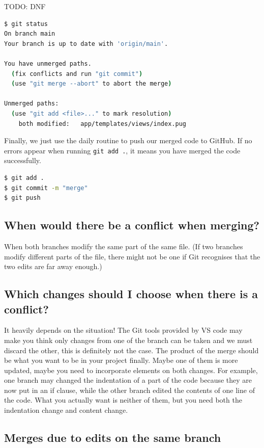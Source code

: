 TODO: DNF

\begin{lstlisting}[language=bash]
$ git status
On branch main
Your branch is up to date with 'origin/main'.

You have unmerged paths.
  (fix conflicts and run "git commit")
  (use "git merge --abort" to abort the merge)

Unmerged paths:
  (use "git add <file>..." to mark resolution)
	both modified:   app/templates/views/index.pug
\end{lstlisting}

Finally, we just use the daily routine to push our merged code to GitHub. If no errors appear when running \texttt{git add .}, it means you have merged the code successfully.
\vspace{6mm}

\begin{lstlisting}[language=bash]
$ git add .
$ git commit -m "merge"
$ git push
\end{lstlisting}

\subsection*{When would there be a conflict when merging?}

When both branches modify the same part of the same file. (If two branches modify different parts of the file, there might not be one if Git recognises that the two edits are far away enough.)

\subsection*{Which changes should I choose when there is a conflict?}

It heavily depends on the situation! The Git tools provided by VS code may make you think only changes from one of the branch can be taken and we must discard the other, this is definitely not the case. The product of the merge should be what you want to be in your project finally. Maybe one of them is more updated, maybe you need to incorporate elements on both changes. For example, one branch may changed the indentation of a part of the code because they are now put in an if clause, while the other branch edited the contents of one line of the code. What you actually want is neither of them, but you need both the indentation change and content change.

\subsection{Merges due to edits on the same branch}


